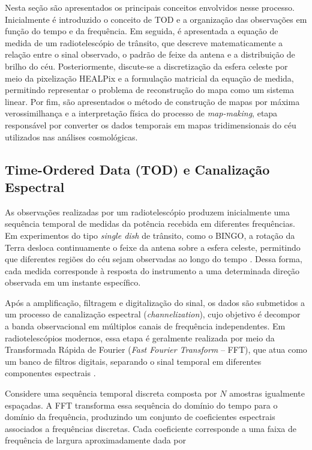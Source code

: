 Nesta seção são apresentados os principais conceitos envolvidos nesse processo. Inicialmente é introduzido o conceito de TOD e a organização das observações em função do tempo e da frequência. Em seguida, é apresentada a equação de medida de um radiotelescópio de trânsito, que descreve matematicamente a relação entre o sinal observado, o padrão de feixe da antena e a distribuição de brilho do céu. Posteriormente, discute-se a discretização da esfera celeste por meio da pixelização HEALPix e a formulação matricial da equação de medida, permitindo representar o problema de reconstrução do mapa como um sistema linear. Por fim, são apresentados o método de construção de mapas por máxima verossimilhança e a interpretação física do processo de \textit{map-making}, etapa responsável por converter os dados temporais em mapas tridimensionais do céu utilizados nas análises cosmológicas.

\subsection{Time-Ordered Data (TOD) e Canalização Espectral}

As observações realizadas por um radiotelescópio produzem inicialmente uma sequência temporal de medidas da potência recebida em diferentes frequências. Em experimentos do tipo \textit{single dish} de trânsito, como o BINGO, a rotação da Terra desloca continuamente o feixe da antena sobre a esfera celeste, permitindo que diferentes regiões do céu sejam observadas ao longo do tempo \cite{abdalla2022bingoI,wuensche2022bingoII}. Dessa forma, cada medida corresponde à resposta do instrumento a uma determinada direção observada em um instante específico.


Após a amplificação, filtragem e digitalização do sinal, os dados são submetidos a um processo de canalização espectral (\textit{channelization}), cujo objetivo é decompor a banda observacional em múltiplos canais de frequência independentes. Em radiotelescópios modernos, essa etapa é geralmente realizada por meio da Transformada Rápida de Fourier (\textit{Fast Fourier Transform} -- FFT), que atua como um banco de filtros digitais, separando o sinal temporal em diferentes componentes espectrais \cite{oppenheim1999discrete, thompson2017interferometry}.

Considere uma sequência temporal discreta composta por $N$ amostras igualmente espaçadas. A FFT transforma essa sequência do domínio do tempo para o domínio da frequência, produzindo um conjunto de coeficientes espectrais associados a frequências discretas. Cada coeficiente corresponde a uma faixa de frequência de largura aproximadamente dada por

